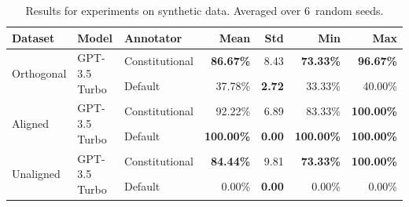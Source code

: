 \begin{table}[H]
\centering
\caption{Results for experiments on synthetic data. Averaged over 6~random seeds.}
\label{tab:synthetic_num_results}
\begin{tabularx}{\textwidth}{lllrrrr}
\toprule
\textbf{Dataset} & \textbf{Model} & \textbf{Annotator} & \textbf{Mean} & \textbf{Std} & \textbf{Min} & \textbf{Max} \\
\midrule
\multirow[t]{2}{*}{Orthogonal} & \multirow[t]{2}{*}{GPT-3.5 Turbo} & Constitutional & \textbf{86.67\%} & 8.43 & \textbf{73.33\%} & \textbf{96.67\%} \\
 &  & Default & 37.78\% & \textbf{2.72} & 33.33\% & 40.00\% \\
\multirow[t]{2}{*}{Aligned} & \multirow[t]{2}{*}{GPT-3.5 Turbo} & Constitutional & 92.22\% & 6.89 & 83.33\% & \textbf{100.00\%} \\
 &  & Default & \textbf{100.00\%} & \textbf{0.00} & \textbf{100.00\%} & \textbf{100.00\%} \\
\multirow[t]{2}{*}{Unaligned} & \multirow[t]{2}{*}{GPT-3.5 Turbo} & Constitutional & \textbf{84.44\%} & 9.81 & \textbf{73.33\%} & \textbf{100.00\%} \\
 &  & Default & 0.00\% & \textbf{0.00} & 0.00\% & 0.00\% \\
\bottomrule
\end{tabularx}
\end{table}

